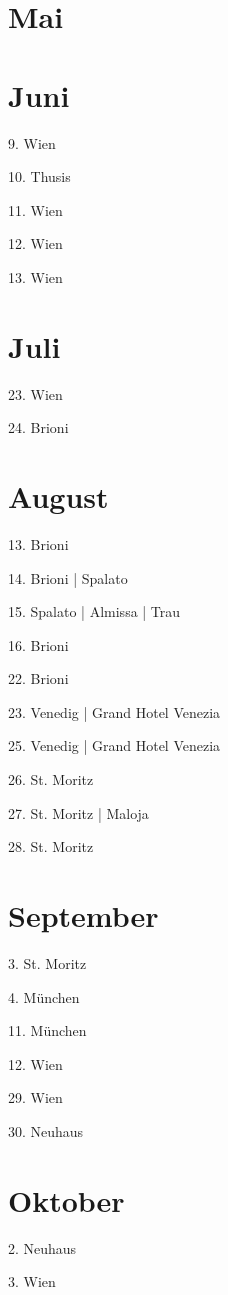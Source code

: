 \documentclass[twoside=false,titlepage=false,open=any, parskip=never, fontsize=10pt, headings=small, chapterprefix=false, appendixprefix=false, DIV=15]{scrbook}
\begin{document}
\begin{multicols}{3}
            \section*{Mai}
            \section*{Juni}
            9. Wien\par
            10. Thusis\par
            11. Wien\par
            12. Wien\par
            13. Wien\par
            \section*{Juli}
            23. Wien\par
            24. Brioni\par
            \section*{August}
            13. Brioni\par
            14. Brioni | Spalato\par
            15. Spalato | Almissa | Trau\par
            16. Brioni\par
            22. Brioni\par
            23. Venedig | Grand Hotel Venezia\par
            25. Venedig | Grand Hotel Venezia\par
            26. St. Moritz\par
            27. St. Moritz | Maloja\par
            28. St. Moritz\par
            \section*{September}
            3. St. Moritz\par
            4. München\par
            11. München\par
            12. Wien\par
            29. Wien\par
            30. Neuhaus\par
            \section*{Oktober}
            2. Neuhaus\par
            3. Wien\par

\end{multicols}
\end{document}

